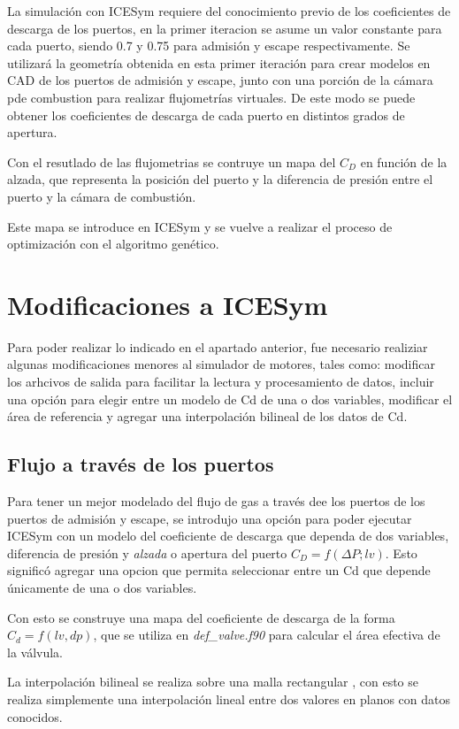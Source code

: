 La simulación con ICESym requiere del conocimiento previo de los coeficientes
de descarga de los puertos, en la primer iteracion se asume un valor constante
para cada puerto, siendo 0.7 y 0.75 para admisión y escape respectivamente.
%
Se utilizará la geometría obtenida en esta primer iteración para crear modelos
en CAD de los puertos de admisión y escape, junto con una porción de la cámara
pde combustion para realizar flujometrías virtuales.
%
De este modo se puede obtener los coeficientes de descarga de cada puerto en
distintos grados de apertura.

Con el resutlado de las flujometrias se contruye un mapa del $C_D$ en función
de la alzada, que representa la posición del puerto y la diferencia de presión
entre el puerto y la cámara de combustión.

Este mapa se introduce en ICESym y se vuelve a realizar el proceso de optimización
con el algoritmo genético.

\section{Modificaciones a ICESym}
%
Para poder realizar lo indicado en el apartado anterior, fue necesario
realiziar algunas modificaciones menores al simulador de motores, tales como:
modificar los arhcivos de salida para facilitar la lectura y procesamiento de
datos, incluir una opción para elegir entre un modelo de Cd de una o dos
variables, modificar el área de referencia y  agregar una interpolación
bilineal de los datos de Cd.

\subsection{Flujo a través de los puertos}
%
Para tener un mejor modelado del flujo de gas a través dee los puertos de los
puertos de admisión y escape, se introdujo una opción para poder ejecutar
ICESym con un modelo del coeficiente de descarga que dependa de dos variables,
diferencia de presión y \emph{alzada} o apertura del puerto $C_D = f(\Delta P;
lv)$.
%
Esto significó agregar una opcion que permita seleccionar entre un Cd que
depende únicamente de una o dos variables.

Con esto se construye una mapa del coeficiente de descarga de la forma $C_d =
f(lv, dp)$, que se utiliza en \emph{def\_valve.f90} para calcular el área
efectiva de la válvula.

La interpolación bilineal se realiza sobre una malla rectangular , con esto se
realiza simplemente una interpolación lineal entre dos valores en planos con
datos conocidos.

